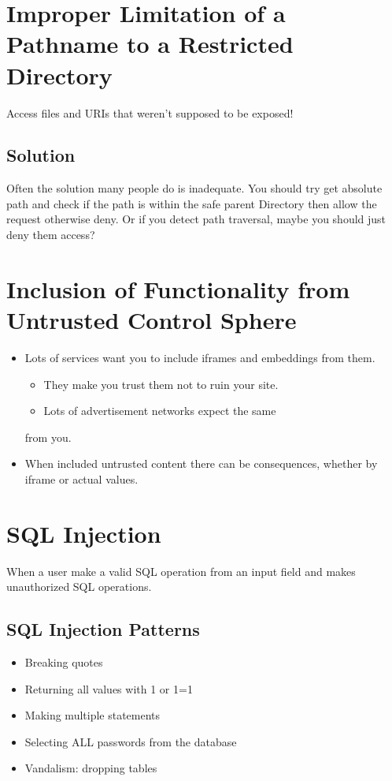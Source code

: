\documentclass[../CMPUT-404-Notes.tex]{subfiles}
\begin{document}
\section{Improper Limitation of a Pathname to a Restricted Directory}
Access files and URIs that weren't supposed to be exposed!
\subsection{Solution}
Often the solution many people do is inadequate. You should try get absolute path and check if the path is within the safe parent Directory then allow the request otherwise deny.
Or if you detect path traversal, maybe you should just deny them access?

\section{Inclusion of Functionality from Untrusted Control Sphere}
\begin{itemize}
    \item Lots of services want you to include iframes
    and embeddings from them.
    \begin{itemize}
        \item They make you trust them not to ruin your site.
        \item Lots of advertisement networks expect the same
    \end{itemize}
    from you.
    \item When included untrusted content there can
    be consequences, whether by iframe or
    actual values.
\end{itemize}

\section{SQL Injection}
When a user make a valid SQL operation from an input field and makes unauthorized SQL operations.


\subsection{SQL Injection Patterns}
\begin{itemize}
    \item Breaking quotes
    \item Returning all values with 1 or 1=1
    \item Making multiple statements
    \item Selecting ALL passwords from the database
    \item Vandalism: dropping tables
\end{itemize}
\end{document}
